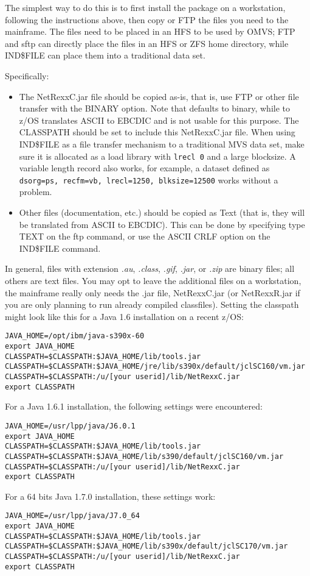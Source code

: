 The simplest way to do this is to first install the package on a
workstation, following the instructions above, then copy or FTP the
files you need to the mainframe.  The files need to be placed in an
HFS to be used by OMVS; FTP and sftp can directly place the files in
an HFS or ZFS
home directory, while IND\$FILE can place them into a traditional data
set.

Specifically:
\begin{itemize}
\item The NetRexxC.jar file should be copied as-is, that is, use
FTP or other file transfer with the BINARY option.  Note that
 defaults to binary, while  to z/OS translates
ASCII to EBCDIC and is not usable for this purpose. The CLASSPATH should
be set to include this NetRexxC.jar file. When using IND\$FILE as a
file transfer mechanism to a traditional MVS data set, make sure it is
allocated as a load library with \texttt{lrecl 0} and a large
blocksize. A variable length record also works, for example, a dataset
defined as \texttt{dsorg=ps, recfm=vb, lrecl=1250, blksize=12500}
works without a problem.
\item Other files (documentation, etc.) should be copied as Text (that is,
they will be translated from ASCII to EBCDIC). This can be done by specifying type TEXT on the ftp
command, or use the ASCII CRLF option on the IND\$FILE command.
\end{itemize}

In general, files with extension \emph{.au}, \emph{.class}, \emph{.gif}, \emph{.jar},
or \emph{.zip} are binary files; all others are text files. You may
opt to leave the additional files on a workstation, the mainframe
really only needs the .jar file, NetRexxC.jar (or NetRexxR.jar if you
are only planning to run already compiled classfiles).
Setting the classpath might look like this for a Java 1.6 installation
on a recent z/OS:
\begin{lstlisting}
JAVA_HOME=/opt/ibm/java-s390x-60
export JAVA_HOME
CLASSPATH=$CLASSPATH:$JAVA_HOME/lib/tools.jar
CLASSPATH=$CLASSPATH:$JAVA_HOME/jre/lib/s390x/default/jclSC160/vm.jar
CLASSPATH=$CLASSPATH:/u/[your userid]/lib/NetRexxC.jar
export CLASSPATH
\end{lstlisting}
For a Java 1.6.1 installation, the following settings were
encountered:
\begin{lstlisting}
JAVA_HOME=/usr/lpp/java/J6.0.1
export JAVA_HOME
CLASSPATH=$CLASSPATH:$JAVA_HOME/lib/tools.jar
CLASSPATH=$CLASSPATH:$JAVA_HOME/lib/s390/default/jclSC160/vm.jar
CLASSPATH=$CLASSPATH:/u/[your userid]/lib/NetRexxC.jar
export CLASSPATH
\end{lstlisting}
For a 64 bits Java 1.7.0 installation, these settings work:
\begin{lstlisting}
JAVA_HOME=/usr/lpp/java/J7.0_64
export JAVA_HOME
CLASSPATH=$CLASSPATH:$JAVA_HOME/lib/tools.jar
CLASSPATH=$CLASSPATH:$JAVA_HOME/lib/s390x/default/jclSC170/vm.jar
CLASSPATH=$CLASSPATH:/u/[your userid]/lib/NetRexxC.jar
export CLASSPATH
\end{lstlisting}

